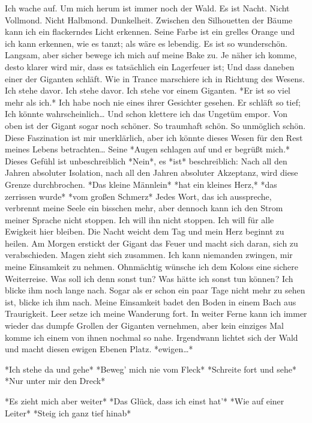 \documentclass{article}
\begin{document}
	Ich wache auf.  
	Um mich herum ist immer noch der Wald. Es ist Nacht. Nicht Vollmond. Nicht Halbmond. Dunkelheit. Zwischen den Silhouetten der Bäume kann ich ein flackerndes Licht erkennen. Seine Farbe ist ein grelles Orange und ich kann erkennen, wie es tanzt; als wäre es lebendig. Es ist so wunderschön. Langsam, aber sicher bewege ich mich auf meine Bake zu. Je näher ich komme, desto klarer wird mir, dass es tatsächlich ein Lagerfeuer ist; Und dass daneben einer der Giganten schläft. Wie in Trance marschiere ich in Richtung des Wesens. Ich stehe davor. Ich stehe davor. Ich stehe vor einem Giganten. *Er ist so viel mehr als ich.* Ich habe noch nie eines ihrer Gesichter gesehen. Er schläft so tief; Ich könnte wahrscheinlich… Und schon klettere ich das Ungetüm empor. Von oben ist der Gigant sogar noch schöner. So traumhaft schön. So unmöglich schön. Diese Faszination ist mir unerklärlich, aber ich könnte dieses Wesen für den Rest meines Lebens betrachten… Seine *Augen schlagen auf und er begrüßt mich.* Dieses Gefühl ist unbeschreiblich \- *Nein*, es *ist* beschreiblich: Nach all den Jahren absoluter Isolation, nach all den Jahren absoluter Akzeptanz, wird diese Grenze durchbrochen.  
	*Das kleine Männlein*  
	*hat ein kleines Herz,*  
	*das zerrissen wurde*  
	*vom großen Schmerz*  
	Jedes Wort, das ich ausspreche, verbrennt meine Seele ein bisschen mehr, aber dennoch kann ich den Strom meiner Sprache nicht stoppen. Ich will ihn nicht stoppen. Ich will für alle Ewigkeit hier bleiben. Die Nacht weicht dem Tag und mein Herz beginnt zu heilen. Am Morgen erstickt der Gigant das Feuer und macht sich daran, sich zu verabschieden. Magen zieht sich zusammen. Ich kann niemanden zwingen, mir meine Einsamkeit zu nehmen. Ohnmächtig wünsche ich dem Koloss eine sichere Weiterreise. Was soll ich denn sonst tun? Was hätte ich sonst tun können? Ich blicke ihm noch lange nach. Sogar als er schon ein paar Tage nicht mehr zu sehen ist, blicke ich ihm nach. Meine Einsamkeit badet den Boden in einem Bach aus Traurigkeit. Leer setze ich meine Wanderung fort. In weiter Ferne kann ich immer wieder das dumpfe Grollen der Giganten vernehmen, aber kein einziges Mal komme ich einem von ihnen nochmal so nahe. Irgendwann lichtet sich der Wald und macht diesen ewigen Ebenen Platz. *ewigen…*
	
	*Ich stehe da und gehe*  
	*Beweg’ mich nie vom Fleck*  
	*Schreite fort und sehe*  
	*Nur unter mir den Dreck*
	
	*Es zieht mich aber weiter*  
	*Das Glück, dass ich einst hat’*  
	*Wie auf einer Leiter*  
	*Steig ich ganz tief hinab*
	
\end{document}
